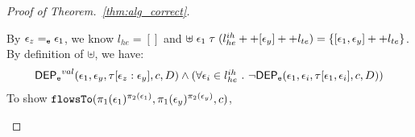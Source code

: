 \begin{proof}[Proof of Theorem.~\ref{thm:alg_correct}]
\begin{case}
\begin{subcase}
\begin{subsubcase}[$\event_z \eventeq \event_1$]
By $\event_z \eventeq \event_1$, we know $l_{he} = []$ and 
$\uplus \; \mathtt{\epsilon}_1 \; \mathtt{\tau} \;  (l^{ih}_{he} ++ [\mathtt{\epsilon}_y] ++ l_{te}) 
= \{[\mathtt{\epsilon}_1, \mathtt{\epsilon}_y] ++ l_{te}\}$.
%
%
\\
By definition of $\uplus$, we have:
\[
\begin{array}{l}
  \mathsf{DEP_{\mathtt{e}}}^{val}(\mathtt{\epsilon}_1, \mathtt{\epsilon}_y, \mathtt{\tau}[\mathtt{\epsilon}_z:\mathtt{\epsilon}_y], c, D)
  \land (\forall \mathtt{\epsilon}_i \in l^{ih}_{he} ~.~ \neg \mathsf{DEP_{\mathtt{e}}}(\mathtt{\epsilon}_1, \mathtt{\epsilon}_i, \mathtt{\tau}[\mathtt{\epsilon}_1, \mathtt{\epsilon}_i], c, D))
  \end{array}
\]
%
%
To show $\mathtt{flowsTo}(\pi_1(\mathtt{\epsilon}_1)^{\pi_2(\mathtt{\epsilon}_1)}, \pi_1(\mathtt{\epsilon}_y)^{\pi_2(\mathtt{\epsilon}_y)}, c)$, 

\end{subsubcase}
\end{subcase}
\end{case}
\end{proof}

